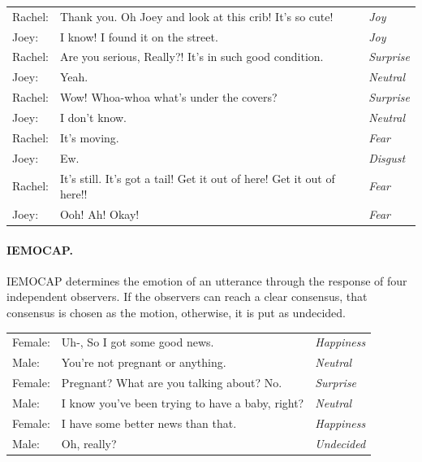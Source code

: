 \documentclass[nofilelist]{cslthse-msc}
\begin{document}
\begin{table}[!ht]
    \begin{pag}

    \centering
    \begin{tabular}{lll}
Rachel: & Thank you. Oh Joey and look at this crib! It's so cute! & \textit{Joy} \\
Joey: & I know! I found it on the street. & \textit{Joy} \\
Rachel: & Are you serious, Really?! It's in such good condition. & \textit{Surprise} \\
Joey: & Yeah. & \textit{Neutral} \\
Rachel: & Wow! Whoa-whoa what's under the covers? & \textit{Surprise} \\
Joey: & I don't know. & \textit{Neutral} \\
Rachel: & It's moving. & \textit{Fear} \\
Joey: & Ew. & \textit{Disgust} \\
Rachel: & It's still. It's got a tail! Get it out of here! Get it out of here!! & \textit{Fear} \\
Joey: & Ooh! Ah! Okay! & \textit{Fear} \\
    \end{tabular}
    \label{tab:dialogue_meld}
\end{pag}
\end{table}

\paragraph{IEMOCAP.}
IEMOCAP determines the emotion of an utterance through the response of four independent observers. If the observers can reach a clear consensus, that consensus is chosen as the motion, otherwise, it is put as undecided.  

\begin{table}[!ht]
    \begin{pag}

    \centering
    \begin{tabular}{lll}
Female: & Uh-, So I got some good news. & \textit{Happiness} \\
Male: & You're not pregnant or anything. & \textit{Neutral} \\
Female: & Pregnant? What are you talking about? No. & \textit{Surprise} \\
Male: & I know you've been trying to have a baby, right? & \textit{Neutral} \\
Female: & I have some better news than that. & \textit{Happiness} \\
Male: & Oh, really? & \textit{Undecided} \\
    \end{tabular}
    \label{tab:dialogue_iemocap}
\end{pag}
\end{table}
\end{document}
